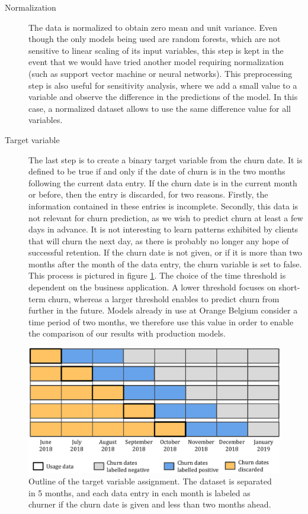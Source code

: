 \begin{description}
	\item[Normalization] The data is normalized to obtain zero mean and unit
	variance. Even though the only models being used are random forests, which
	are not sensitive to linear scaling of its input variables, this step is
	kept in the event that we would have tried another model requiring
	normalization (such as support vector machine or neural networks). This
	preprocessing step is also useful for sensitivity analysis, where we add a
	small value to a variable and observe the difference in the predictions of
	the model. In this case, a normalized dataset allows to use the same
	difference value for all variables.

    \item[Target variable] The last step is to create a binary target variable
    from the churn date. It is defined to be true if and only if the date of
    churn is in the two months following the current data entry. If the churn
    date is in the current month or before, then the entry is discarded, for two
    reasons. Firstly, the information contained in these entries is incomplete.
    Secondly, this data is not relevant for churn prediction, as we wish to
    predict churn at least a few days in advance. It is not interesting to learn
    patterns exhibited by clients that will churn the next day, as there is
    probably no longer any hope of successful retention. If the churn date is
    not given, or if it is more than two months after the month of the data
    entry, the churn variable is set to false. This process is pictured in
    figure \ref{fig:data_separated}. The choice of the time threshold is
    dependent on the business application. A lower threshold focuses on
    short-term churn, whereas a larger threshold enables to predict churn from
    further in the future. Models already in use at Orange Belgium consider a
    time period of two months, we therefore use this value in order to enable
    the comparison of our results with production models.

\end{description}

\begin{figure}
    \centering
	\includegraphics[width=0.9\linewidth]{figures/data_range.pdf}
	\caption{Outline of the target variable assignment. The dataset is separated
	in 5 months, and each data entry in each month is labeled as churner if the
	churn date is given and less than two months ahead.}
	\label{fig:data_separated}
\end{figure}

